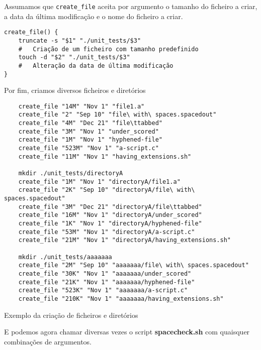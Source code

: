 Assumamos que \verb|create_file| aceita por argumento o tamanho do ficheiro a criar, a data da última modificação e o nome do
ficheiro a criar.
\begin{verbatim}
create_file() {
    truncate -s "$1" "./unit_tests/$3"
    #   Criação de um ficheiro com tamanho predefinido
    touch -d "$2" "./unit_tests/$3"
    #   Alteração da data de última modificação
}
\end{verbatim}

Por fim, criamos diversos ficheiros e diretórios
\begin{listing}[H]
\begin{verbatim}
    create_file "14M" "Nov 1" "file1.a"
    create_file "2" "Sep 10" "file\ with\ spaces.spacedout"
    create_file "4M" "Dec 21" "file\ttabbed"
    create_file "3M" "Nov 1" "under_scored"
    create_file "1M" "Nov 1" "hyphened-file"
    create_file "523M" "Nov 1" "a-script.c"
    create_file "11M" "Nov 1" "having_extensions.sh"
    
    mkdir ./unit_tests/directoryA
    create_file "1M" "Nov 1" "directoryA/file1.a"
    create_file "2K" "Sep 10" "directoryA/file\ with\ spaces.spacedout"
    create_file "3M" "Dec 21" "directoryA/file\ttabbed"
    create_file "16M" "Nov 1" "directoryA/under_scored"
    create_file "1K" "Nov 1" "directoryA/hyphened-file"
    create_file "53M" "Nov 1" "directoryA/a-script.c"
    create_file "21M" "Nov 1" "directoryA/having_extensions.sh"
    
    mkdir ./unit_tests/aaaaaaa
    create_file "2M" "Sep 10" "aaaaaaa/file\ with\ spaces.spacedout"
    create_file "30K" "Nov 1" "aaaaaaa/under_scored"
    create_file "21K" "Nov 1" "aaaaaaa/hyphened-file"
    create_file "523K" "Nov 1" "aaaaaaa/a-script.c"
    create_file "210K" "Nov 1" "aaaaaaa/having_extensions.sh"
\end{verbatim}
\caption{Exemplo da criação de ficheiros e diretórios}
\end{listing}
E podemos agora chamar diversas vezes o script \textbf{spacecheck.sh} com quaisquer combinações de argumentos.
